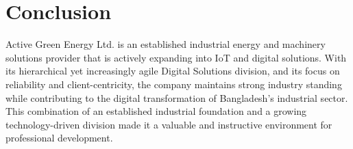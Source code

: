 \section{Conclusion}
\par Active Green Energy Ltd. is an established industrial energy and machinery solutions provider that is actively expanding into IoT and digital solutions. With its hierarchical yet increasingly agile Digital Solutions division, and its focus on reliability and client-centricity, the company maintains strong industry standing while contributing to the digital transformation of Bangladesh's industrial sector. This combination of an established industrial foundation and a growing technology-driven division made it a valuable and instructive environment for professional development.
